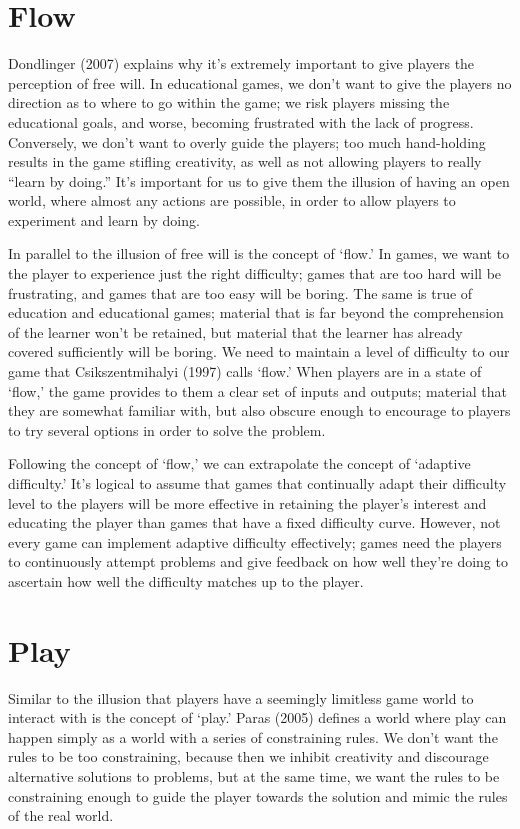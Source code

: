 \documentclass[12pt]{report}
\begin{document}
	\section{Flow}

		Dondlinger (2007) explains why it's extremely important to give players the perception of free will. In educational games, we don't want to give the players no direction as to where to go within the game; we risk players missing the educational goals, and worse, becoming frustrated with the lack of progress. Conversely, we don't want to overly guide the players; too much hand-holding results in the game stifling creativity, as well as not allowing players to really “learn by doing.” It's important for us to give them the illusion of having an open world, where almost any actions are possible, in order to allow players to experiment and learn by doing.

		In parallel to the illusion of free will is the concept of `flow.' In games, we want to the player to experience just the right difficulty; games that are too hard will be frustrating, and games that are too easy will be boring. The same is true of education and educational games; material that is far beyond the comprehension of the learner won't be retained, but material that the learner has already covered sufficiently will be boring. We need to maintain a level of difficulty to our game that Csikszentmihalyi (1997) calls `flow.' When players are in a state of `flow,' the game provides to them a clear set of inputs and outputs; material that they are somewhat familiar with, but also obscure enough to encourage to players to try several options in order to solve the problem.

		Following the concept of `flow,' we can extrapolate the concept of `adaptive difficulty.' It's logical to assume that games that continually adapt their difficulty level to the players will be more effective in retaining the player's interest and educating the player than games that have a fixed difficulty curve. However, not every game can implement adaptive difficulty effectively; games need the players to continuously attempt problems and give feedback on how well they're doing to ascertain how well the difficulty matches up to the player.

	\section{Play}

		Similar to the illusion that players have a seemingly limitless game world to interact with is the concept of `play.' Paras (2005) defines a world where play can happen simply as a world with a series of constraining rules. We don't want the rules to be too constraining, because then we inhibit creativity and discourage alternative solutions to problems, but at the same time, we want the rules to be constraining enough to guide the player towards the solution and mimic the rules of the real world.
		
\end{document}
